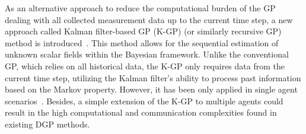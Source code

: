 As an alternative approach to reduce the computational burden of the GP dealing with all collected measurement data up to the current time step, a new approach called Kalman filter-based GP (K-GP) (or similarly recursive GP) method is introduced~\citep{solin2018modeling}. This method allows for the sequential estimation of unknown scalar fields within the Bayesian framework. Unlike the conventional GP, which relies on all historical data, the K-GP only requires data from the current time step, utilizing the Kalman filter's ability to process past information based on the Markov property. However, it has been only applied in single agent scenarios~\citep{8880505, viset2022extended}.
Besides, a simple extension of the K-GP to multiple agents could result in the high computational and communication complexities found in existing DGP methods.